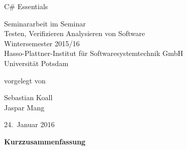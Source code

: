 \documentclass[11pt, a4paper]{article}
\begin{document}
          

\begin{titlepage}
  \begin{center} 
    \mbox{}
    \vspace{1cm}
    
    {\huge C\# Essentials \\[1em] {\LARGE }}  
        
    \vspace{5cm}
    
    Seminararbeit im Seminar \\[1em]
    {\large \sc Testen, Verifizieren Analysieren von Software} \\[1em]
    Wintersemester 2015/16 \\[1em]
    Hasso-Plattner-Institut für Softwaresystemtechnik GmbH \\[1em]
    Universität Potsdam
    
    \vspace{4cm}
    
		vorgelegt von
		
    \vspace{1em}
    
		{\Large Sebastian Koall} \\
		{\Large Jaspar Mang}
		
    \vspace{4em}
    
    24.~Januar 2016
  \end{center}
\end{titlepage}


\setcounter{page}{1}

\begin{center}
{\bf Kurzzusammenfassung} 
\end{center}

\noindent


\newpage

\tableofcontents 

\newpage

\printnoidxglossaries

\newpage

 
\newpage

\newpage

\newpage


\newpage




\end{document}
